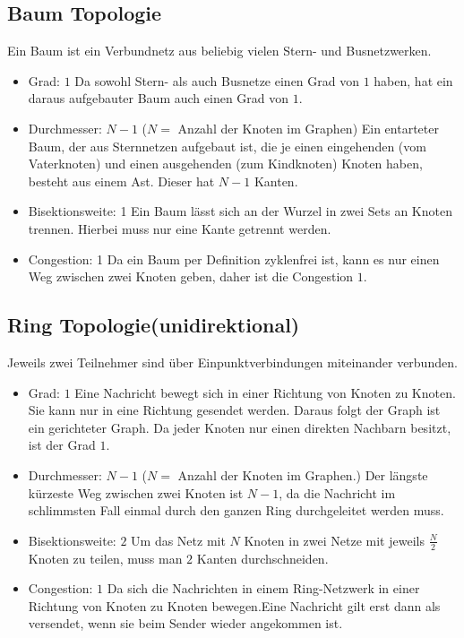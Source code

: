 \subsection{Baum Topologie}
Ein Baum ist ein Verbundnetz aus beliebig vielen Stern- und Busnetzwerken.
\begin{itemize}
  \item Grad: $1$
  \newline Da sowohl Stern- als auch Busnetze einen Grad von $1$ haben, hat ein
  daraus aufgebauter Baum auch einen Grad von $1$.
  \item Durchmesser: $N-1$ ($N =$ Anzahl der Knoten im Graphen)
   \newline Ein entarteter Baum, der aus Sternnetzen aufgebaut ist, die je einen
   eingehenden (vom Vaterknoten) und einen ausgehenden (zum Kindknoten) Knoten
   haben, besteht aus einem Ast. Dieser hat $N-1$ Kanten.
  \item Bisektionsweite: 1
  \newline Ein Baum lässt sich an der Wurzel in zwei Sets an Knoten trennen.
  Hierbei muss nur eine Kante getrennt werden.
  \item Congestion: 1
  \newline Da ein Baum per Definition zyklenfrei ist, kann es nur einen Weg
  zwischen zwei Knoten geben, daher ist die Congestion $1$.
\end{itemize}

\subsection{Ring Topologie(unidirektional)}
 Jeweils zwei Teilnehmer sind über Einpunktverbindungen miteinander verbunden.
\begin{itemize}
  \item Grad: $1$
  \newline Eine Nachricht bewegt sich in einer Richtung von Knoten zu Knoten. 
  Sie kann nur in eine Richtung gesendet werden. Daraus folgt der Graph ist ein
  gerichteter Graph. Da jeder Knoten nur einen direkten Nachbarn besitzt, ist
  der Grad $1$.
  \item Durchmesser: $N-1$ ($N =$ Anzahl der Knoten im Graphen.)
   \newline Der längste kürzeste Weg zwischen zwei Knoten ist $N-1$, da die
   Nachricht im schlimmsten Fall einmal durch den ganzen Ring durchgeleitet
   werden muss.
  \item Bisektionsweite: $2$
  \newline  Um das Netz mit $N$ Knoten in zwei Netze mit jeweils $\frac{N}{2}$
  Knoten zu teilen, muss man $2$ Kanten durchschneiden.
  \item Congestion: $1$
  \newline Da sich die Nachrichten in einem Ring-Netzwerk in einer Richtung von
  Knoten zu Knoten bewegen.Eine Nachricht gilt erst dann als versendet, wenn
  sie beim Sender wieder angekommen ist.
\end{itemize}


